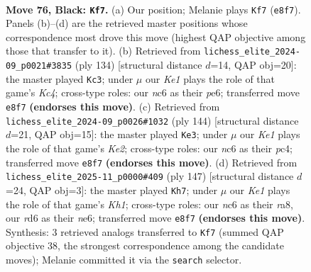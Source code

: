 \documentclass[11pt]{article}
\begin{document}
\clearpage

\begin{figure}[p]\centering
\begin{subfigure}{0.46\textwidth}\centering
\resizebox{\linewidth}{!}{%
\newchessgame
\chessboard[
  setfen={4k3/6p1/2NR1p2/7p/3P3P/r5P1/5K2/8 b - - 46 76},
  showmover=false,
  pgfstyle=straightmove, color=movearrow, markmove={e8-f7}
]}
\caption{}
\end{subfigure}\hfill
\begin{subfigure}{0.46\textwidth}\centering
\resizebox{\linewidth}{!}{%
\newchessgame
\chessboard[
  setfen={8/R7/1r2p1k1/5p2/p1K2P2/P7/1P6/8 w - - 2 68},
  showmover=false,
  pgfstyle=straightmove, color=movearrow, markmove={c4-c3}
]}
\caption{}
\end{subfigure}
\\[4pt]
\begin{subfigure}{0.46\textwidth}\centering
\resizebox{\linewidth}{!}{%
\newchessgame
\chessboard[
  setfen={8/5p2/6p1/2k3P1/2prPP2/8/4K3/1R6 w - - 2 73},
  showmover=false,
  pgfstyle=straightmove, color=movearrow, markmove={e2-e3}
]}
\caption{}
\end{subfigure}\hfill
\begin{subfigure}{0.46\textwidth}\centering
\resizebox{\linewidth}{!}{%
\newchessgame
\chessboard[
  setfen={R6k/8/4N1pp/2pn4/6P1/6KP/P1r5/8 b - - 9 74},
  showmover=false,
  pgfstyle=straightmove, color=movearrow, markmove={h8-h7}
]}
\caption{}
\end{subfigure}
\caption{\textbf{Move 76, Black: \texttt{Kf7}.} (a) Our position; Melanie plays \texttt{Kf7} (\texttt{e8f7}). Panels (b)--(d) are the retrieved master positions whose correspondence most drove this move (highest QAP objective among those that transfer to it). (b) Retrieved from \texttt{lichess\_elite\_2024-09\_p0021\#3835} (ply 134) [structural distance $d$=14, QAP obj=20]: the master played \texttt{Kc3}; under $\mu$ our \emph{Ke1} plays the role of that game's \emph{Kc4}; cross-type roles: our \emph{n}c6 as their \emph{p}e6; transferred move \texttt{e8f7} \textbf{(endorses this move)}. (c) Retrieved from \texttt{lichess\_elite\_2024-09\_p0026\#1032} (ply 144) [structural distance $d$=21, QAP obj=15]: the master played \texttt{Ke3}; under $\mu$ our \emph{Ke1} plays the role of that game's \emph{Ke2}; cross-type roles: our \emph{n}c6 as their \emph{p}c4; transferred move \texttt{e8f7} \textbf{(endorses this move)}. (d) Retrieved from \texttt{lichess\_elite\_2025-11\_p0000\#409} (ply 147) [structural distance $d$=24, QAP obj=3]: the master played \texttt{Kh7}; under $\mu$ our \emph{Ke1} plays the role of that game's \emph{Kh1}; cross-type roles: our \emph{n}c6 as their \emph{r}a8, our \emph{r}d6 as their \emph{n}e6; transferred move \texttt{e8f7} \textbf{(endorses this move)}. Synthesis: 3 retrieved analogs transferred to \texttt{Kf7} (summed QAP objective 38, the strongest correspondence among the candidate moves); Melanie committed it via the \texttt{search} selector.}
\label{fig:thought-m151}
\end{figure}
\end{document}
